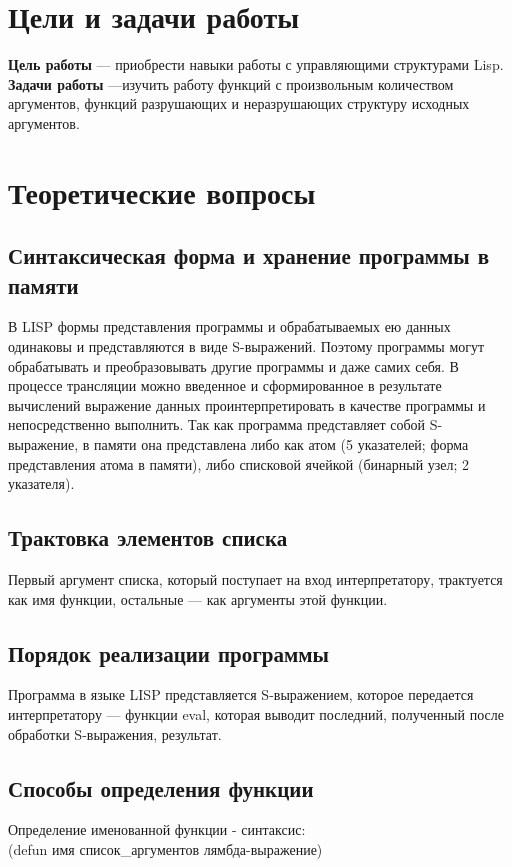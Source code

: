 \chapter{Цели и задачи работы}
\textbf{Цель работы} --- приобрести навыки работы с управляющими структурами Lisp.
\textbf{Задачи работы} ---изучить работу функций с произвольным количеством аргументов, функций
разрушающих и неразрушающих структуру исходных аргументов.

\chapter{Теоретические вопросы}
\section{Синтаксическая форма и хранение программы в памяти}
В LISP формы представления программы и обрабатываемых ею данных одинаковы и представляются в виде S-выражений. Поэтому программы могут обрабатывать и преобразовывать другие программы и даже самих себя. В процессе трансляции можно введенное и сформированное в результате вычислений выражение данных проинтерпретировать в качестве программы и непосредственно выполнить. Так как программа представляет собой S-выражение, в памяти она представлена либо как атом (5 указателей; форма представления атома в памяти), либо списковой ячейкой (бинарный узел; 2 указателя).

\section{Трактовка элементов списка}
Первый аргумент списка, который поступает на вход интерпретатору, трактуется как имя функции, остальные --- как аргументы этой функции.
\section{Порядок реализации программы}
Программа в языке LISP представляется S-выражением, которое передается интерпретатору --- функции eval, которая выводит последний, полученный после обработки S-выражения, результат.

\section{Способы определения функции}
Определение именованной функции - синтаксис:\\
(defun имя список\_аргументов лямбда-выражение)\\

